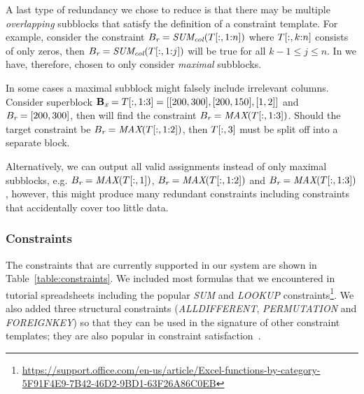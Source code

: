 A last type of redundancy we chose to reduce is that there may be multiple \textit{overlapping} subblocks that satisfy the definition of a constraint template.
For example, consider the constraint $B_{\textit{r}} = \textit{SUM\textsubscript{col}}(T[:,1{:}n])$ where $T[:,k{:}n]$ consists of only zeros, then $B_{\textit{r}} = \textit{SUM\textsubscript{col}}(T[:,1{:}j])$ will be true for all $k - 1 \leq j \leq n$.
In \sname we have, therefore, chosen to only consider \textit{maximal} subblocks.

In some cases a maximal subblock might falsely include irrelevant columns.
Consider superblock $\mathbf{B_{\textit{x}}} = T[:,1{:}3] = [[200, 300], [200, 150], [1, 2]]$ and $B_{\textit{r}} = [200, 300]$, then \sname will find the constraint $B_{\textit{r}} = \textit{MAX}(T[:,1{:}3])$.
Should the target constraint be $B_{\textit{r}} = \textit{MAX}(T[:,1{:}2])$, then $T[:,3]$ must be split off into a separate block.

Alternatively, we can output all valid assignments instead of only maximal subblocks, e.g. $B_{\textit{r}} = \textit{MAX}(T[:,1])$, $B_{\textit{r}} = \textit{MAX}(T[:,1{:}2])$ and $B_{\textit{r}} = \textit{MAX}(T[:,1{:}3])$, however, this might produce many redundant constraints including constraints that accidentally cover too little data.





\subsubsection{Constraints} \label{sec:which_cons}
The  constraints that are currently supported in our system are shown in Table~\ref{table:constraints}.
We included most formulas that we encountered in tutorial spreadsheets including the popular \textit{SUM} and \textit{LOOKUP} constraints\footnote{\href{https://support.office.com/en-us/article/Excel-functions-by-category-5F91F4E9-7B42-46D2-9BD1-63F26A86C0EB}{https://support.office.com/en-us/article/Excel-functions-by-category-5F91F4E9-7B42-46D2-9BD1-63F26A86C0EB}}.
We also added three structural constraints (\textit{ALLDIFFERENT}, \textit{PERMUTATION} and \textit{FOREIGNKEY}) so that they can be used in the signature of other constraint templates; they are also popular in constraint satisfaction~\cite{modelseeker}.

